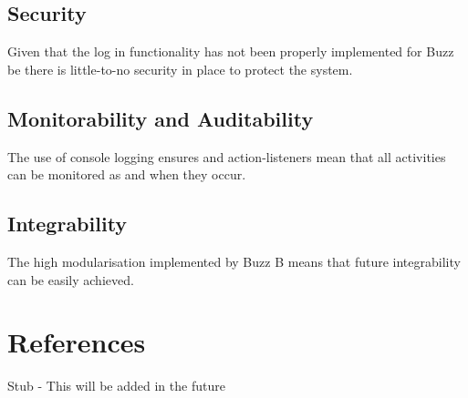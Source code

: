 \documentclass[12pt]{article}
\begin{document}
\subsection{Security}
Given that the log in functionality has not been properly implemented for Buzz be there is little-to-no security in place to protect the system.
\subsection{Monitorability and Auditability}
The use of console logging ensures and action-listeners mean that all activities can be monitored as and when they occur.
\subsection{Integrability}
The high modularisation implemented by Buzz B means that future integrability can be easily achieved.


\section{References}
Stub - This will be added in the future
\end{document}
